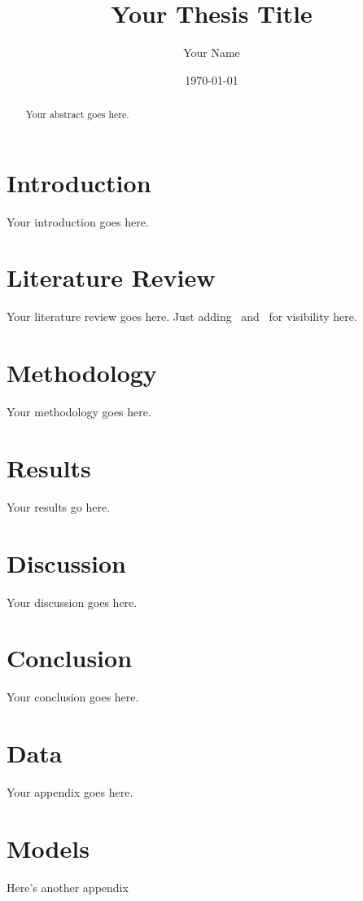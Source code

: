 \documentclass[12pt]{article}
\title{Your Thesis Title}
\author{Your Name}
\date{\today}
\begin{document}
\maketitle
\pagebreak

\begin{abstract}
Your abstract goes here.
\end{abstract}
\pagebreak

\tableofcontents
\pagebreak

\section{Introduction}\label{sect:introduction}
Your introduction goes here.

\section{Literature Review}\label{sect:literature_review}
Your literature review goes here.
Just adding~\parencite{Lagasio2024} and~\parencite{Wu2020} for visibility here.
\parencite{Bingler2022}
\parencite{Bingler2024}
\parencite{Callaway2024}
\parencite{Gourier2024}
\parencite{Ilhan2023}

\section{Methodology}\label{sect:methodology}
Your methodology goes here.

\section{Results}\label{sect:results}
Your results go here.

\section{Discussion}\label{sect:discussion}
Your discussion goes here.

\section{Conclusion}\label{sect:conclusion}
Your conclusion goes here.

\pagebreak
\printbibliography{}
\pagebreak
\appendix

\section{Data}
Your appendix goes here.

\section{Models}
Here's another appendix
\end{document}
